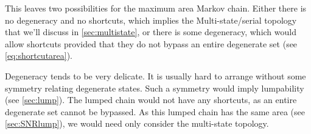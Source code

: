 \documentclass[9pt,twocolumn,twoside,lineno]{pnas-new}
\newcommand{\W}{\mathbf{W}}
\newcommand{\pot}{^{\text{pot}}}
\newcommand{\dep}{^{\text{dep}}}
\newcommand{\potdep}{^{\text{pot/dep}}}
\begin{document}
\begin{strip}
%

This leaves two possibilities for the maximum area Markov chain.
Either there is no degeneracy and no shortcuts, which implies the Multi-state/serial topology that we'll discuss in \cref{sec:multistate}, or there is some degeneracy, which would allow shortcuts provided that they do not bypass an entire degenerate set (see \cref{eq:shortcutarea}).

Degeneracy tends to be very delicate. It is usually hard to arrange without some symmetry relating degenerate states. Such a symmetry would imply lumpability (see \cref{sec:lump}). The lumped chain would not have any shortcuts, as an entire degenerate set cannot be bypassed. As this lumped chain has the same area (see \cref{sec:SNRlump}), we would need only consider the multi-state topology.



\end{strip}
\end{document}

